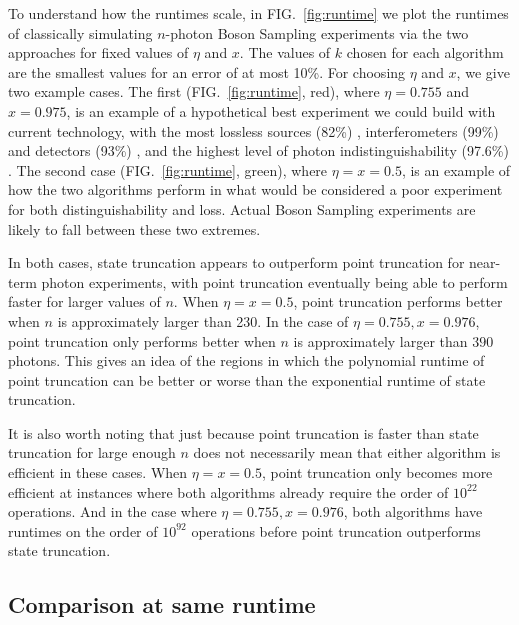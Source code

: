 To understand how the runtimes scale, in FIG.\ \ref{fig:runtime} we plot the runtimes of classically simulating $n$-photon Boson Sampling experiments via the two approaches for fixed values of $\eta$ and $x$. 
The values of $k$ chosen for each algorithm are the smallest values for an error of at most 10\%. 
For choosing $\eta$ and $x$, we give two example cases. 
The first (FIG.\ \ref{fig:runtime}, red), where $\eta=0.755$ and $x=0.975$, is an example of a hypothetical best experiment we could build with current technology, with the most lossless sources (82\%) \cite{slussarenko2017}, interferometers (99\%) \cite{wang2018} and detectors (93\%) \cite{marsili2013}, and the highest level of photon indistinguishability (97.6\%) \cite{he2018}. 
The second case (FIG.\ \ref{fig:runtime}, green), where $\eta=x=0.5$, is an example of how the two algorithms perform in what would be considered a poor experiment for both distinguishability and loss. 
Actual Boson Sampling experiments are likely to fall between these two extremes.

In both cases, state truncation appears to outperform point truncation for near-term photon experiments, with point truncation eventually being able to perform faster for larger values of $n$. 
When $\eta=x=0.5$, point truncation performs better when $n$ is approximately larger than 230. 
In the case of $\eta=0.755, x=0.976$, point truncation only performs better when $n$ is approximately larger than $390$ photons. 
This gives an idea of the regions in which the polynomial runtime of point truncation can be better or worse than the exponential runtime of state truncation.

It is also worth noting that just because point truncation is faster than state truncation for large enough $n$ does not necessarily mean that either algorithm is efficient in these cases. 
When $\eta=x=0.5$, point truncation only becomes more efficient at instances where both algorithms already require the order of $10^{22}$ operations. 
And in the case where $\eta=0.755, x=0.976$, both algorithms have runtimes on the order of $10^{92}$ operations before point truncation outperforms state truncation.


\subsection{Comparison at same runtime}
\label{subsec:same-runtime}

